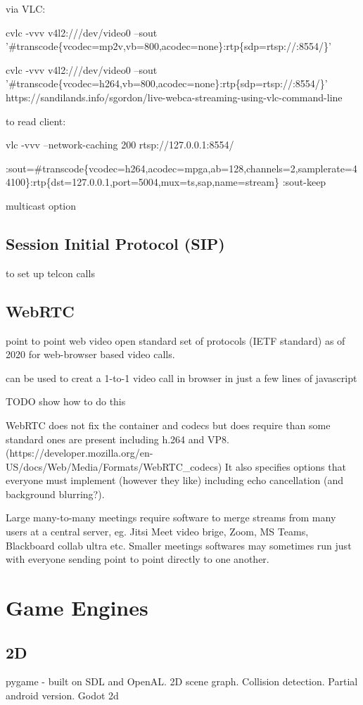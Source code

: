 \documentclass[oneside,english]{scrbook}
\begin{document}
via VLC: 

cvlc -vvv v4l2:///dev/video0 --sout '\#transcode\{vcodec=mp2v,vb=800,acodec=none\}:rtp\{sdp=rtsp://:8554/\}' 

cvlc -vvv v4l2:///dev/video0 --sout '\#transcode\{vcodec=h264,vb=800,acodec=none\}:rtp\{sdp=rtsp://:8554/\}'
https://sandilands.info/sgordon/live-webca-streaming-using-vlc-command-line

to read client: 

vlc -vvv --network-caching 200 rtsp://127.0.0.1:8554/

:sout=\#transcode\{vcodec=h264,acodec=mpga,ab=128,channels=2,samplerate=44100\}:rtp\{dst=127.0.0.1,port=5004,mux=ts,sap,name=stream\}
:sout-keep

multicast option


\section{Session Initial Protocol (SIP)}

to set up telcon calls


\section{WebRTC}
point to point web video open standard set of protocols (IETF standard) as of 2020 for web-browser based video calls.

can be used to creat a 1-to-1 video call in browser in just a few lines of javascript 

TODO show how to do this

WebRTC does not fix the container and codecs but does require than some standard ones are present including h.264 and VP8. (https://developer.mozilla.org/en-US/docs/Web/Media/Formats/WebRTC_codecs)  It also specifies options that everyone must implement (however they like) including echo cancellation (and background blurring?).

Large many-to-many meetings require software to merge streams from many users at a central server, eg. Jitsi Meet video brige, Zoom, MS Teams, Blackboard collab ultra etc.
Smaller meetings softwares may sometimes run just with everyone sending point to point directly to one another.



\chapter{Game Engines}
\section{2D}
pygame - built on SDL and OpenAL.  2D scene graph. Collision detection. Partial android version.
Godot 2d
\end{document}
